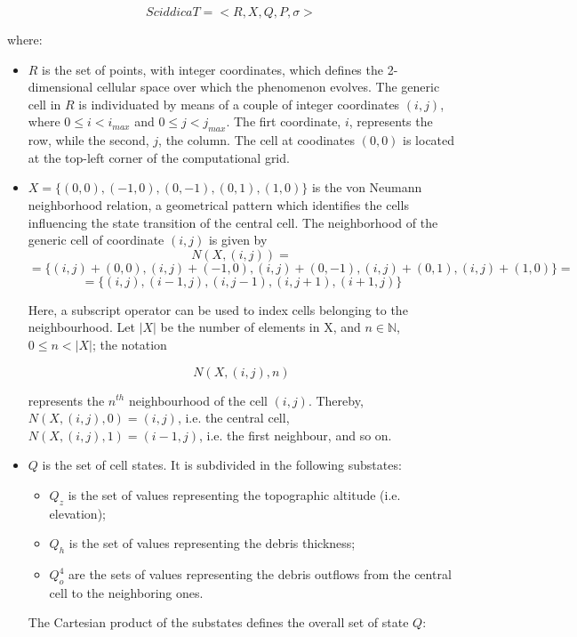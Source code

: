 $$SciddicaT = < R, X, Q , P, \sigma  >$$

where:

\begin{itemize}

\item $R$ is the set of points, with integer coordinates, which
  defines the 2-dimensional cellular space over which the phenomenon
  evolves. The generic cell in $R$ is individuated by means of a
  couple of integer coordinates $(i, j)$, where $0 \leq i < i_{max}$
  and $0 \leq j < j_{max}$. The firt coordinate, $i$, represents the
  row, while the second, $j$, the column. The cell at coodinates
  $(0,0)$ is located at the top-left corner of the computational grid.

\item $X = \{(0,0), (-1, 0), (0, -1), (0, 1), (1, 0)\}$ is the von
  Neumann neighborhood relation, a geometrical pattern which
  identifies the cells influencing the state transition of the central
  cell. The neighborhood of the generic cell of coordinate $(i, j)$ is
  given by
$$N(X, (i, j)) =$$
$$= \{(i, j)+(0,0), (i, j)+(-1, 0), (i, j)+(0, -1),
(i, j)+(0, 1), (i, j)+(1, 0)\} =$$
$$= \{(i, j), (i-1, j), (i, j-1), (i, j+1), (i+1, j)\}$$

Here, a subscript operator can be used to index cells belonging to the
neighbourhood. Let $|X|$ be the number of elements in X, and $n \in
\mathbb{N}$, $0 \leq n < |X|$; the notation

$$N(X, (i, j), n)$$

represents the $n^{th}$ neighbourhood of the cell $(i,j)$. Thereby, $N(X, (i, j), 0) = (i, j)$, i.e. the central cell, $N(X, (i, j), 1) = (i-1, j)$, i.e. the first neighbour, and so on. 
  
\item $Q$ is the set of cell states. It is subdivided in the following
  substates:

\begin{itemize}
    \item   $Q_z$ is the set of values representing the topographic altitude (i.e. elevation);
    \item   $Q_h$ is the set of values representing the debris thickness;
    \item   $Q_o^4$ are the sets of values representing the debris outflows from the central cell to the neighboring ones.
\end{itemize}

The Cartesian product of the substates defines the overall set of
state $Q$:


\end{itemize}
